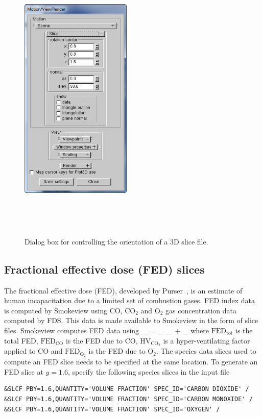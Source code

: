 \documentclass[11pt,twoside]{book}
\begin{document}
\begin{figure}[bph]
\centerline{
\includegraphics[width=2.083333in]{FIGURES/figGSLICE}
}\ \caption[Dialog box for controlling the orientation of a 3D slice file.]{Dialog box for controlling the orientation of a 3D slice file.}\ \label{figGSLICE}
\end{figure}

\subsection{Fractional effective dose (FED) slices}
The fractional effective dose (FED), developed by Purser~\cite{SFPE:Purser},
is an estimate of human incapacitation
due to a limited set of combustion gases.
FED index data is computed by Smokeview using CO, $\mathrm{CO_2}$ and $\mathrm{O_2}$ gas
concentration data computed by FDS.
This data is made available to Smokeview in the form of slice files.
Smokeview computes FED data using
\be
{}_\ = _
\times {}_\ + _
\ee
where $\mathrm{FED}_\mathrm{tot}$ is the total FED,
$\mathrm{FED}_\mathrm{CO}$ is the FED due to CO,
$\mathrm{HV}_\mathrm{CO_2}$ is a hyper-ventilating factor
applied to CO and $\mathrm{FED}_\mathrm{O_2}$
is the FED due to $\mathrm{O_2}$.
The species data slices used to compute an FED slice needs to be specified at the
same location.  To generate an FED slice at $y=1.6$, specify the following species slices in the input file
\begin{lstlisting}
&SLCF PBY=1.6,QUANTITY='VOLUME FRACTION' SPEC_ID='CARBON DIOXIDE' /
&SLCF PBY=1.6,QUANTITY='VOLUME FRACTION' SPEC_ID='CARBON MONOXIDE' /
&SLCF PBY=1.6,QUANTITY='VOLUME FRACTION' SPEC_ID='OXYGEN' /
\end{lstlisting}
\end{document}
